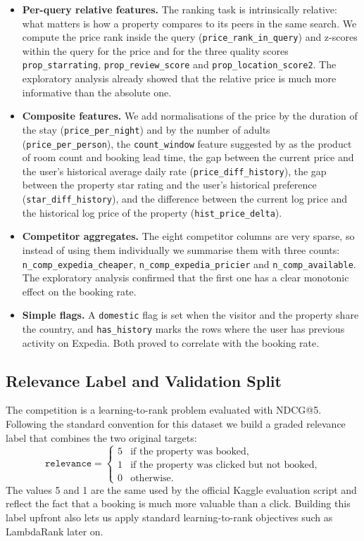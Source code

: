 \documentclass[runningheads]{llncs}
\begin{document}
\begin{itemize}
    \item \textbf{Per-query relative features.} The ranking task is intrinsically relative: what matters is how a property compares to its peers in the same search. We compute the price rank inside the query (\texttt{price\_rank\_in\_query}) and z-scores within the query for the price and for the three quality scores \texttt{prop\_starrating}, \texttt{prop\_review\_score} and \texttt{prop\_location\_score2}. The exploratory analysis already showed that the relative price is much more informative than the absolute one.
    \item \textbf{Composite features.} We add normalisations of the price by the duration of the stay (\texttt{price\_per\_night}) and by the number of adults (\texttt{price\_per\_person}), the \texttt{count\_window} feature suggested by \cite{DBLP:journals/corr/LiuXZYPLSW13} as the product of room count and booking lead time, the gap between the current price and the user's historical average daily rate (\texttt{price\_diff\_history}), the gap between the property star rating and the user's historical preference (\texttt{star\_diff\_history}), and the difference between the current log price and the historical log price of the property (\texttt{hist\_price\_delta}).
    \item \textbf{Competitor aggregates.} The eight competitor columns are very sparse, so instead of using them individually we summarise them with three counts: \texttt{n\_comp\_expedia\_cheaper}, \texttt{n\_comp\_expedia\_pricier} and \texttt{n\_comp\_available}. The exploratory analysis confirmed that the first one has a clear monotonic effect on the booking rate.
    \item \textbf{Simple flags.} A \texttt{domestic} flag is set when the visitor and the property share the country, and \texttt{has\_history} marks the rows where the user has previous activity on Expedia. Both proved to correlate with the booking rate.
\end{itemize}

\subsection{Relevance Label and Validation Split}
The competition is a learning-to-rank problem evaluated with NDCG@5. Following the standard convention for this dataset we build a graded relevance label that combines the two original targets:
\[
    \texttt{relevance} =
    \begin{cases}
        5 & \text{if the property was booked,} \\
        1 & \text{if the property was clicked but not booked,} \\
        0 & \text{otherwise.}
    \end{cases}
\]
The values 5 and 1 are the same used by the official Kaggle evaluation script and reflect the fact that a booking is much more valuable than a click. Building this label upfront also lets us apply standard learning-to-rank objectives such as LambdaRank later on.
\end{document}
